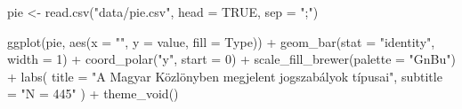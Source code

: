 \documentclass[
]{book}
\newenvironment{Shaded}{\begin{snugshade}}{\end{snugshade}}
\newcommand{\AttributeTok}[1]{\textcolor[rgb]{0.77,0.63,0.00}{#1}}
\newcommand{\ConstantTok}[1]{\textcolor[rgb]{0.00,0.00,0.00}{#1}}
\newcommand{\DecValTok}[1]{\textcolor[rgb]{0.00,0.00,0.81}{#1}}
\newcommand{\FunctionTok}[1]{\textcolor[rgb]{0.00,0.00,0.00}{#1}}
\newcommand{\NormalTok}[1]{#1}
\newcommand{\OtherTok}[1]{\textcolor[rgb]{0.56,0.35,0.01}{#1}}
\newcommand{\SpecialCharTok}[1]{\textcolor[rgb]{0.00,0.00,0.00}{#1}}
\newcommand{\StringTok}[1]{\textcolor[rgb]{0.31,0.60,0.02}{#1}}
\begin{document}
\begin{Shaded}
\begin{Highlighting}[]
\NormalTok{pie }\OtherTok{\textless{}{-}} \FunctionTok{read.csv}\NormalTok{(}\StringTok{"data/pie.csv"}\NormalTok{, }\AttributeTok{head =} \ConstantTok{TRUE}\NormalTok{, }\AttributeTok{sep =} \StringTok{";"}\NormalTok{)}

\FunctionTok{ggplot}\NormalTok{(pie, }\FunctionTok{aes}\NormalTok{(}\AttributeTok{x =} \StringTok{""}\NormalTok{, }\AttributeTok{y =}\NormalTok{ value, }\AttributeTok{fill =}\NormalTok{ Type)) }\SpecialCharTok{+}
  \FunctionTok{geom\_bar}\NormalTok{(}\AttributeTok{stat =} \StringTok{"identity"}\NormalTok{, }\AttributeTok{width =} \DecValTok{1}\NormalTok{) }\SpecialCharTok{+}
  \FunctionTok{coord\_polar}\NormalTok{(}\StringTok{"y"}\NormalTok{, }\AttributeTok{start =} \DecValTok{0}\NormalTok{) }\SpecialCharTok{+}
  \FunctionTok{scale\_fill\_brewer}\NormalTok{(}\AttributeTok{palette =} \StringTok{"GnBu"}\NormalTok{) }\SpecialCharTok{+}
  \FunctionTok{labs}\NormalTok{(}
    \AttributeTok{title =} \StringTok{"A Magyar Közlönyben megjelent jogszabályok típusai"}\NormalTok{,}
    \AttributeTok{subtitle =} \StringTok{"N = 445"}
\NormalTok{  ) }\SpecialCharTok{+}
  \FunctionTok{theme\_void}\NormalTok{()}
\end{Highlighting}
\end{Shaded}
\end{document}
